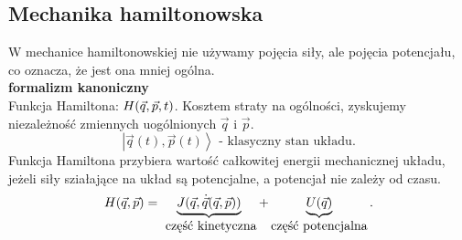 \subsection{Mechanika hamiltonowska}
W mechanice hamiltonowskiej nie używamy pojęcia siły, ale pojęcia potencjału,
co oznacza, że jest ona mniej ogólna.\\

\textbf{formalizm kanoniczny}\\
Funkcja Hamiltona: $ H(\vec{q},\vec{p},t)$. Kosztem straty na ogólności, zyskujemy 
niezależność zmiennych uogólnionych $\vec{q}$ i $\vec{p}$.\\
$$ \left| \vec{q}(t), \vec{p}(t) \right> \mbox{ - klasyczny stan układu.} $$
Funkcja Hamiltona przybiera wartość całkowitej energii mechanicznej układu, jeżeli
siły sziałające na układ są potencjalne, a potencjał nie zależy od czasu.
$$ H(\vec{q},\vec{p}) = \underbrace{J(\vec{q},\dot{\vec{q}}(\vec{q},\vec{p}))}_{\mbox{
część kinetyczna}} + \underbrace{U(\vec{q})}_{\mbox{część potencjalna}}.$$

